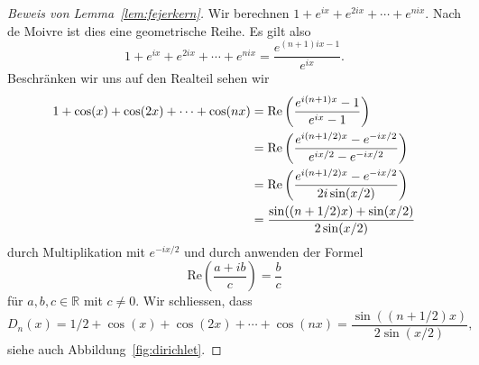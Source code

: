 \documentclass[../main.tex]{subfiles}
\begin{document}
\begin{proof}[Beweis von Lemma~\ref{lem:fejerkern}]
  Wir berechnen
  \(
    1 + e^{ix} + e^{2ix} + \cdots + e^{nix}.
  \)
  Nach de Moivre ist dies eine geometrische Reihe.
  Es gilt also
  \[
    1 + e^{ix} + e^{2ix} + \cdots + e^{nix} = \frac{e^{(n+1)ix - 1}}{e^{ix}}.
  \]
  Beschränken wir uns auf den Realteil sehen wir
  \begin{align*}
    1 + \cos(x) + \cos(2x) + \cdots + \cos(nx) 
    &=
    \textup{Re} \left( \frac{e^{i(n+1)x} - 1}{e^{ix} - 1} \right)\\
    &
    = \textup{Re} \left( \frac{e^{i(n + 1/2)x} - e^{-ix/2}}{e^{ix/2} - e^{-ix/2}} \right)\\
    &
    = \textup{Re} \left( \frac{e^{i(n + 1/2)x} - e^{-ix/2}}{2i \sin(x/2)} \right)\\
    &= \frac{\sin((n+1/2)x) + \sin(x/2)}{2 \sin(x/2)}
  \end{align*}
  durch Multiplikation mit $e^{-ix/2}$ und durch anwenden der Formel
  \[
    \text{Re}\left( \frac{a + ib}{c} \right) = \frac{b}{c}
  \]
  für $a, b, c \in \mathbb{R}$ mit $c \neq 0$.
  Wir schliessen, dass
  \[
    D_n(x) = 1/2 + \cos(x) + \cos(2x) + \cdots + \cos(nx)
    = \frac{\sin((n+ 1/2)x)}{2 \sin(x/2)},
  \]
  siehe auch Abbildung~\ref{fig:dirichlet}.


\end{proof}
\end{document}

